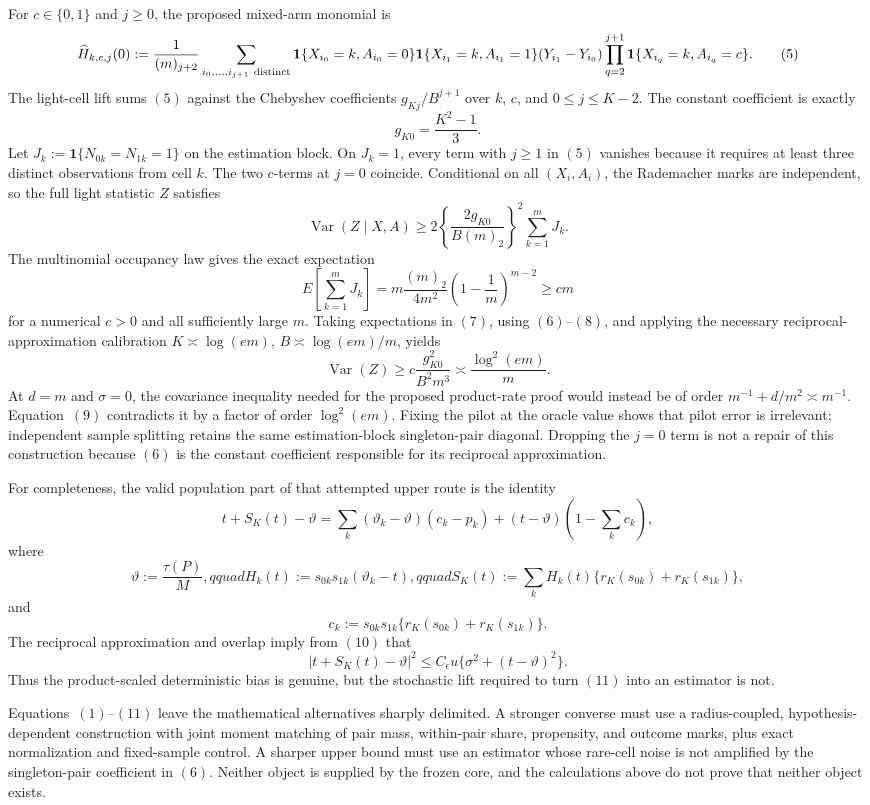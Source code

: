 For \(c\in\{0,1\}\) and \(j\ge0\), the proposed mixed-arm monomial is
\[
 \widehat H_{k,c,j}(0)
 :=\frac1{(m)_{j+2}}
 \sum_{i_0,\ldots,i_{j+1}\ {\rm distinct}}
 \mathbf1\{X_{i_0}=k,A_{i_0}=0\}
 \mathbf1\{X_{i_1}=k,A_{i_1}=1\}
 (Y_{i_1}-Y_{i_0})
 \prod_{q=2}^{j+1}\mathbf1\{X_{i_q}=k,A_{i_q}=c\}.
\tag{5}
\]
The light-cell lift sums \((5)\) against the Chebyshev coefficients
\(g_{Kj}/B^{j+1}\) over \(k\), \(c\), and \(0\le j\le K-2\).  The constant coefficient is exactly
\[
 g_{K0}=\frac{K^2-1}{3}.
\tag{6}
\]
Let \(J_k:=\mathbf1\{N_{0k}=N_{1k}=1\}\) on the estimation block.  On \(J_k=1\), every term with \(j\ge1\) in \((5)\) vanishes because it requires at least three distinct observations from cell \(k\).  The two \(c\)-terms at \(j=0\) coincide.  Conditional on all \((X_i,A_i)\), the Rademacher marks are independent, so the full light statistic \(Z\) satisfies
\[
 \operatorname{Var}(Z\mid X,A)
 \ge
 2\left\{\frac{2g_{K0}}{B(m)_2}\right\}^{\!2}
 \sum_{k=1}^m J_k.
\tag{7}
\]
The multinomial occupancy law gives the exact expectation
\[
 E\!\left[\sum_{k=1}^mJ_k\right]
 =m\frac{(m)_2}{4m^2}
 \left(1-\frac1m\right)^{m-2}
 \ge c m
\tag{8}
\]
for a numerical \(c>0\) and all sufficiently large \(m\).  Taking expectations in \((7)\), using \((6)\)--\((8)\), and applying the necessary reciprocal-approximation calibration
\(K\asymp\log(em)\), \(B\asymp\log(em)/m\), yields
\[
 \operatorname{Var}(Z)
 \ge c\frac{g_{K0}^2}{B^2m^3}
 \asymp \frac{\log^2(em)}m.
\tag{9}
\]
At \(d=m\) and \(\sigma=0\), the covariance inequality needed for the proposed product-rate proof would instead be of order
\(m^{-1}+d/m^2\asymp m^{-1}\).  Equation~\((9)\) contradicts it by a factor of order \(\log^2(em)\).  Fixing the pilot at the oracle value shows that pilot error is irrelevant; independent sample splitting retains the same estimation-block singleton-pair diagonal.  Dropping the \(j=0\) term is not a repair of this construction because \((6)\) is the constant coefficient responsible for its reciprocal approximation.

For completeness, the valid population part of that attempted upper route is the identity
\[
 t+S_K(t)-\vartheta
 =\sum_k(\vartheta_k-\vartheta)(c_k-p_k)
 +(t-\vartheta)\left(1-\sum_kc_k\right),
\tag{10}
\]
where
\[
 \vartheta:=\frac{\tau(P)}M,qquad
 H_k(t):=s_{0k}s_{1k}(\vartheta_k-t),qquad
 S_K(t):=\sum_kH_k(t)\{r_K(s_{0k})+r_K(s_{1k})\},
\]
and
\[
 c_k:=s_{0k}s_{1k}\{r_K(s_{0k})+r_K(s_{1k})\}.
\]
The reciprocal approximation and overlap imply from \((10)\) that
\[
 |t+S_K(t)-\vartheta|^2
 \le C_{\epsilon}u\{\sigma^2+(t-\vartheta)^2\}.
\tag{11}
\]
Thus the product-scaled deterministic bias is genuine, but the stochastic lift required to turn \((11)\) into an estimator is not.

Equations~\((1)\)--\((11)\) leave the mathematical alternatives sharply delimited.  A stronger converse must use a radius-coupled, hypothesis-dependent construction with joint moment matching of pair mass, within-pair share, propensity, and outcome marks, plus exact normalization and fixed-sample control.  A sharper upper bound must use an estimator whose rare-cell noise is not amplified by the singleton-pair coefficient in \((6)\).  Neither object is supplied by the frozen core, and the calculations above do not prove that neither object exists.